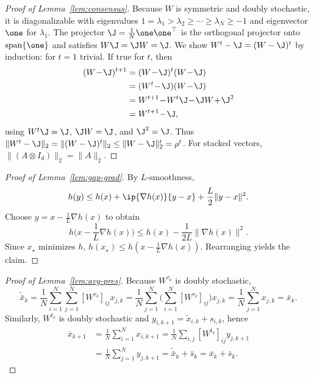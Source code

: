 \documentclass[review,onefignum,onetabnum]{siamart171218}
\begin{document}
\begin{proof}[Proof of Lemma~\ref{lem:consensus}]
Because $W$ is symmetric and doubly stochastic, it is diagonalizable with eigenvalues
$1=\lambda_1>\lambda_2\ge\cdots\ge\lambda_N\ge -1$ and eigenvector $\one$ for $\lambda_1$.
The projector $\J=\frac1N\one\one^\top$ is the orthogonal projector onto $\mathrm{span}\{\one\}$ and satisfies $W\J=\J W=\J$.
We show $W^t-\J=(W-\J)^t$ by induction: for $t=1$ trivial. If true for $t$, then
\begin{align*}
(W\!-\!\J)^{t+1}&=(W\!-\!\J)^t(W\!-\!\J)\\
&=(W^t\!-\!\J)(W\!-\!\J)\\
&=W^{t+1}\!-\!W^t\J\!-\!\J W\!+\!\J^2\\
&=W^{t+1}\!-\!\J,
\end{align*}
using $W^t\J=\J$, $\J W=\J$, and $\J^2=\J$.
Thus $\|W^t-\J\|_2=\|(W-\J)^t\|_2\le \|W-\J\|_2^t=\rho^t$.
For stacked vectors, $\|(A\otimes I_d)\|_2=\|A\|_2$.
\end{proof}

\begin{proof}[Proof of Lemma~\ref{lem:gap-grad}]
By $L$-smoothness,
\[
h(y)\le h(x)+\ip{\nabla h(x)}{y-x}+\frac{L}{2}\|y-x\|^2.
\]
Choose $y=x-\frac1L\nabla h(x)$ to obtain
\[
h\Big(x-\frac1L\nabla h(x)\Big)\le h(x)-\frac{1}{2L}\|\nabla h(x)\|^2.
\]
Since $x_\star$ minimizes $h$, $h(x_\star)\le h(x-\frac1L\nabla h(x))$. Rearranging yields the claim.
\end{proof}

\begin{proof}[Proof of Lemma~\ref{lem:avg-pres}]
Because $W^{\tau_k}$ is doubly stochastic,
\[
\tilde{\bar x}_k=\frac1N\sum_{i=1}^N\sum_{j=1}^N [W^{\tau_k}]_{ij}x_{j,k}
=\frac1N\sum_{j=1}^N\Big(\sum_{i=1}^N [W^{\tau_k}]_{ij}\Big)x_{j,k}
=\frac1N\sum_{j=1}^N x_{j,k}=\bar x_k.
\]
Similarly, $W^{t_k}$ is doubly stochastic and $y_{i,k+1}=\tilde x_{i,k}+s_{i,k}$, hence
\begin{align*}
\bar x_{k+1}
&=\tfrac1N\textstyle\sum_{i=1}^N x_{i,k+1}
=\tfrac1N\textstyle\sum_{i,j} [W^{t_k}]_{ij}y_{j,k+1}\\
&=\tfrac1N\textstyle\sum_{j=1}^N y_{j,k+1}
=\tilde{\bar x}_k+\bar s_k=\bar x_k+\bar s_k.
\end{align*}
\end{proof}
\end{document}
